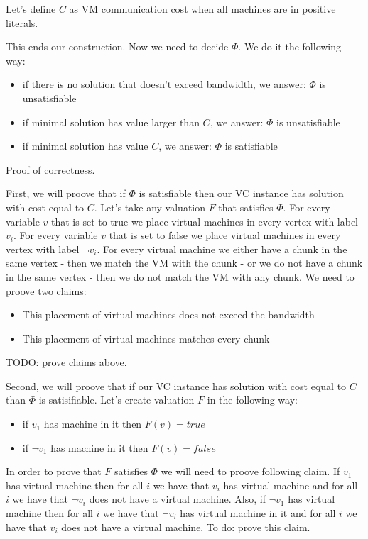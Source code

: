 Let's define $C$ as VM communication cost when all machines are in
positive literals.

This ends our construction. Now we need to decide $\Phi$. We do it the
following way:

\begin{itemize}
\item if there is no solution that doesn't exceed bandwidth, we
  answer: $\Phi$ is unsatisfiable
\item if minimal solution has value larger than $C$, we answer: $\Phi$
  is unsatisfiable
\item if minimal solution has value $C$, we answer: $\Phi$ is satisfiable
\end{itemize}

Proof of correctness.

First, we will proove that if $\Phi$ is satisfiable then our VC
instance has solution with cost equal to $C$. Let's take any valuation $F$
that satisfies $\Phi$. For every variable $v$ that is set to true we
place virtual machines in every vertex with label $v_i$. For every
variable $v$ that is set to false we place virtual machines in every
vertex with label $\neg v_i$. For every virtual machine we either have
a chunk in the same vertex - then we match the VM with the chunk - or
we do not have a chunk in the same vertex - then we do not match the
VM with any chunk. We need to proove two claims:
\begin{itemize}
\item This placement of virtual machines does not exceed the bandwidth
\item This placement of virtual machines matches every chunk
\end{itemize}

TODO: prove claims above.

Second, we will proove that if our VC instance has solution with cost
equal to $C$ than $\Phi$ is satisifiable. Let's create valuation $F$
in the following way:

\begin{itemize}
\item if $v_1$ has machine in it then $F(v) = true$
\item if $\neg v_1$ has machine in it then $F(v) = false$
\end{itemize}

In order to prove that $F$ satisfies $\Phi$ we will need to proove
following claim. If $v_1$ has virtual machine then for all $i$ we have
that $v_i$ has virtual machine and for all $i$ we have that $\neg v_i$
does not have a virtual machine. Also, if $\neg v_1$ has virtual
machine then for all $i$ we have that $\neg v_i$ has virtual machine
in it and for all $i$ we have that $v_i$ does not have a virtual
machine. To do: prove this claim.
